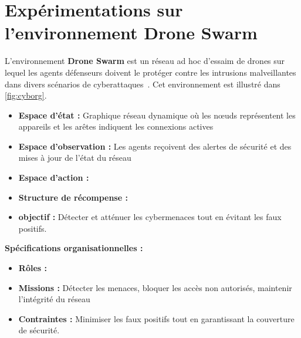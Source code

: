 \section{Expérimentations sur l'environnement Drone Swarm}

L'environnement \textbf{Drone Swarm} est un réseau ad hoc d'essaim de drones sur lequel les agents défenseurs doivent le protéger contre les intrusions malveillantes dans divers scénarios de cyberattaques~\cite{Standen2021}. Cet environnement est illustré dans \autoref{fig:cyborg}.

\begin{itemize}
  \item \textbf{Espace d'état :} Graphique réseau dynamique où les nœuds représentent les appareils et les arêtes indiquent les connexions actives
  \item \textbf{Espace d'observation :} Les agents reçoivent des alertes de sécurité et des mises à jour de l'état du réseau
  \item \textbf{Espace d'action :}
  \item \textbf{Structure de récompense :}
  \item \textbf{objectif :} Détecter et atténuer les cybermenaces tout en évitant les faux positifs.
\end{itemize}
%
\textbf{Spécifications organisationnelles :}
\begin{itemize}
  \item \textbf{Rôles :} 
  \item \textbf{Missions :} Détecter les menaces, bloquer les accès non autorisés, maintenir l'intégrité du réseau
  \item \textbf{Contraintes :} Minimiser les faux positifs tout en garantissant la couverture de sécurité.
\end{itemize}

